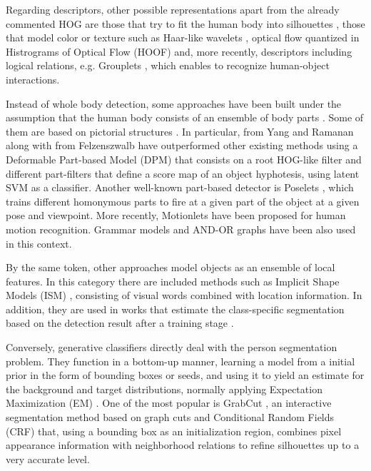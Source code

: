 \documentclass[10pt,twocolumn,letterpaper]{article}
\begin{document}
Regarding descriptors, other possible representations apart from the already commented HOG are those that try to fit the human body into silhouettes \cite{mittal2003human}, those that model color or texture such as Haar-like wavelets \cite{viola2005detecting}, optical flow quantized in Histrograms of Optical Flow (HOOF) \cite{dalal2006human} and, more recently, descriptors including logical relations, e.g. Grouplets \cite{yao2010grouplet}, which enables to recognize human-object interactions.

Instead of whole body detection, some approaches have been built under the assumption that the human body consists of an ensemble of body parts \cite{ramanan2006learning, pirsiavash2012steerable}. Some of them are based on pictorial structures \cite{andriluka2009pictorial, yang2011articulated}. In particular, \cite{yang2011articulated, yang2012articulated} from Yang and Ramanan along with \cite{felzenszwalb2010object} from Felzenszwalb have outperformed other existing methods using a Deformable Part-based Model (DPM) that consists on a root HOG-like filter and different part-filters that define a score map of an object hyphotesis, using latent SVM as a classifier. Another well-known part-based detector is Poselets \cite{bourdev2009poselets, wang2011learning}, which trains different homonymous parts to fire at a given part of the object at a given pose and viewpoint. More recently, Motionlets \cite{wang2013motionlets} have been proposed for human motion recognition. Grammar models \cite{girshick2011object} and AND-OR graphs \cite{zhu2008max} have been also used in this context.

By the same token, other approaches model objects as an ensemble of local features. In this category there are included methods such as Implicit Shape Models (ISM) \cite{leibe2004combined}, consisting of visual words combined with location information. In addition, they are used in works that estimate the class-specific segmentation based on the detection result after a training stage \cite{leibe2008robust}.  

Conversely, generative classifiers directly deal with the person segmentation problem. They function in a bottom-up manner, learning a model from a initial prior in the form of bounding boxes or seeds, and using it to yield an estimate for the background and target distributions, normally applying Expectation Maximization (EM) \cite{shi2000normalized, carson2002blobworld}. One of the most popular is GrabCut \cite{rother2004grabcut, gulshan2011humanising}, an interactive segmentation method based on graph cuts \cite{boykov2001interactive} and Conditional Random Fields (CRF) that, using a bounding box as an initialization region, combines pixel appearance information with neighborhood relations to refine silhouettes up to a very accurate level. 
 
\end{document}
